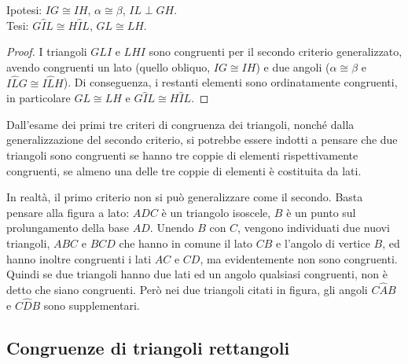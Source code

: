 \noindent \begin{minipage}{0.6\textwidth}
	\noindent Ipotesi: $IG\cong IH$, $\alpha\cong \beta$, $IL\perp GH$.\\
	Tesi: $G\widehat{I}L\cong H\widehat{I}L$, $GL\cong LH$.
	
	\begin{proof}
		I triangoli $GLI$ e $LHI$ sono congruenti per il secondo criterio 
		generalizzato, avendo congruenti un lato (quello obliquo, $IG\cong 
		IH$) e due angoli ($\alpha\cong \beta$ e $I\widehat{L}G \cong 
		I\widehat{L}H$). Di conseguenza, i restanti elementi sono 
		ordinatamente congruenti, in particolare $GL\cong LH$ e 
		$G\widehat{I}L\cong H\widehat{I}L$.
	\end{proof}
\end{minipage}\hfil
\begin{minipage}{0.4\textwidth}
	\centering
\end{minipage}

\osservazione Dall'esame dei primi tre criteri di congruenza dei 
triangoli, nonché dalla generalizzazione del secondo criterio, si 
potrebbe essere indotti a pensare che due triangoli sono congruenti 
se hanno tre coppie di elementi rispettivamente congruenti, se almeno 
una delle tre coppie di elementi è costituita da lati.

\noindent \begin{minipage}{0.6\textwidth}
	In realtà, il primo criterio non si può generalizzare come il 
	secondo. Basta pensare alla figura a lato: $ADC$ è un triangolo 
	isoscele, $B$ è un punto sul prolungamento della base $AD$. Unendo $B$ 
	con $C$, vengono individuati due nuovi triangoli, $ABC$ e $BCD$ che 
	hanno in comune il lato $CB$ e l'angolo di vertice $B$, ed hanno 
	inoltre congruenti i lati $AC$ e $CD$, ma evidentemente non sono 
	congruenti. Quindi se due triangoli hanno due lati ed un angolo 
	qualsiasi congruenti, non è detto che siano congruenti. Però nei due 
	triangoli citati in figura, gli angoli $C\widehat{A}B$ e 
	$C\widehat{D}B$ sono supplementari.
\end{minipage}\hfil
\begin{minipage}{0.4\textwidth}
	\centering
\end{minipage}


\subsection{Congruenze di triangoli rettangoli}


